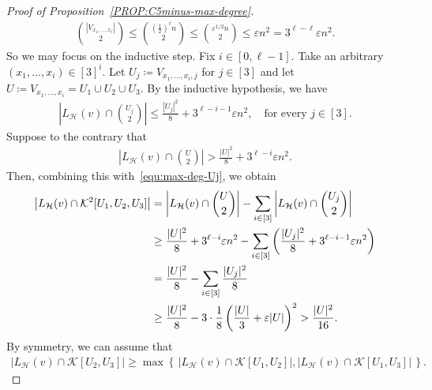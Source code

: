 \documentclass[11pt,a4paper]{article}
\theoremstyle{remark}
\begin{document}
\begin{proof}[Proof of Proposition~\ref{PROP:C5minus-max-degree}]
\begin{align*}
        \binom{|V_{x_1, \ldots, x_{\ell}}|}{2} 
        \le \binom{\left(\frac{1}{2}\right)^{\ell} n}{2} \le \binom{\varepsilon^{1/2} n}{2} 
        \le \varepsilon n^2 = 3^{\ell-\ell} \varepsilon n^2.
    \end{align*}
    So we may focus on the inductive step. 
    Fix $i \in [0,\ell-1]$. Take an arbitrary $(x_1, \ldots, x_{i}) \in [3]^{i}$. 
    Let $U_j \coloneqq V_{x_1, \ldots, x_{i},j}$ for $j \in [3]$ and let $U \coloneqq V_{x_1, \ldots, x_{i}} = U_1 \cup U_2 \cup U_3$.
    By the inductive hypothesis, we have 
    \begin{align}\label{equ:max-deg-Uj}
        \left|L_{\mathcal{H}}(v) \cap \binom{U_j}{2}\right|
        \le \frac{|U_j|^2}{8} + 3^{\ell-i-1} \varepsilon n^2,
        \quad\text{for every }
        j \in [3]. 
    \end{align}
    Suppose to the contrary that 
    \begin{align}\label{equ:max-deg-U}
        \left|L_{\mathcal{H}}(v) \cap \binom{U}{2}\right|
        > \frac{|U|^2}{8} + 3^{\ell-i} \varepsilon n^2. 
    \end{align}
    Then, combining this with~\eqref{equ:max-deg-Uj}, we obtain 
    \begin{align}\label{equ:level-one-Lv-U1U2U3}
        \left|L_{\mathcal{H}}(v) \cap \mathcal{K}^2[U_1, U_2, U_3]\right|
        & = \left|L_{\mathcal{H}}(v) \cap \binom{U}{2}\right| - \sum_{i\in [3]} \left|L_{\mathcal{H}}(v) \cap \binom{U_j}{2}\right| \notag \\
        & \ge \frac{|U|^2}{8} +3^{\ell-i} \varepsilon n^2 - \sum_{i\in [3]}\left(\frac{|U_j|^2}{8} + 3^{\ell-i-1} \varepsilon n^2\right) \notag \\
        & = \frac{|U|^2}{8} - \sum_{i\in [3]}\frac{|U_j|^2}{8} \notag \\
        & \ge \frac{|U|^2}{8} - 3 \cdot \frac{1}{8}\left(\frac{|U|}{3} + \varepsilon |U|\right)^2  
        > \frac{|U|^2}{16}. 
    \end{align}
    By symmetry, we can assume that 
    \begin{align}\label{equ:level-one-Lv-local-max}
       \left|L_{\mathcal{H}}(v) \cap \mathcal{K}[U_2, U_3]\right|
        \ge \max\left\{\,|L_{\mathcal{H}}(v) \cap \mathcal{K}[U_1, U_2]|,|L_{\mathcal{H}}(v) \cap \mathcal{K}[U_1, U_3]|\,\right\}. 
    \end{align}

\end{proof}
\end{document}
